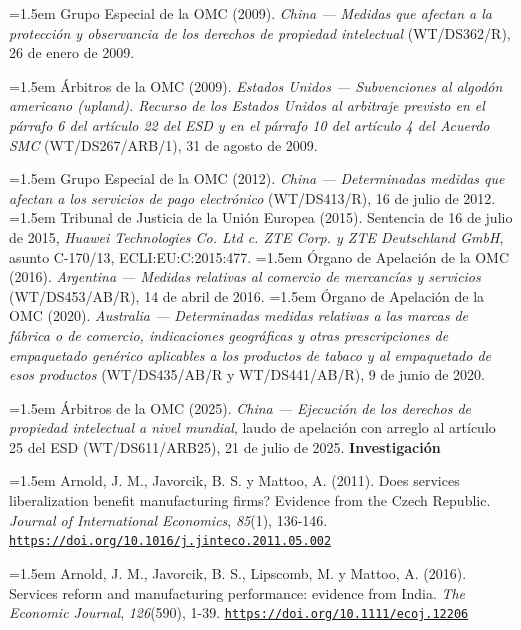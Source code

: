 \documentclass[10pt,a4paper]{article}
\begin{document}
\noindent\hangindent=1.5em Grupo Especial de la OMC (2009). \textit{China --- Medidas que afectan a la protección y observancia de los derechos de propiedad intelectual} (WT/DS362/R), 26 de enero de 2009.

\noindent\hangindent=1.5em Árbitros de la OMC (2009). \textit{Estados Unidos --- Subvenciones al algodón americano (upland). Recurso de los Estados Unidos al arbitraje previsto en el párrafo 6 del artículo 22 del ESD y en el párrafo 10 del artículo 4 del Acuerdo SMC} (WT/DS267/ARB/1), 31 de agosto de 2009.

\noindent\hangindent=1.5em Grupo Especial de la OMC (2012). \textit{China --- Determinadas medidas que afectan a los servicios de pago electrónico} (WT/DS413/R), 16 de julio de 2012.
\noindent\hangindent=1.5em Tribunal de Justicia de la Unión Europea (2015). Sentencia de 16 de julio de 2015, \textit{Huawei Technologies Co. Ltd c. ZTE Corp. y ZTE Deutschland GmbH}, asunto C-170/13, ECLI:EU:C:2015:477.
\noindent\hangindent=1.5em Órgano de Apelación de la OMC (2016). \textit{Argentina --- Medidas relativas al comercio de mercancías y servicios} (WT/DS453/AB/R), 14 de abril de 2016.
\noindent\hangindent=1.5em Órgano de Apelación de la OMC (2020). \textit{Australia --- Determinadas medidas relativas a las marcas de fábrica o de comercio, indicaciones geográficas y otras prescripciones de empaquetado genérico aplicables a los productos de tabaco y al empaquetado de esos productos} (WT/DS435/AB/R y WT/DS441/AB/R), 9 de junio de 2020.

\noindent\hangindent=1.5em Árbitros de la OMC (2025). \textit{China --- Ejecución de los derechos de propiedad intelectual a nivel mundial}, laudo de apelación con arreglo al artículo 25 del ESD (WT/DS611/ARB25), 21 de julio de 2025.
\textbf{Investigación}

\noindent\hangindent=1.5em Arnold, J. M., Javorcik, B. S. y Mattoo, A. (2011). Does services liberalization benefit manufacturing firms? Evidence from the Czech Republic. \textit{Journal of International Economics}, \textit{85}(1), 136-146. \href{https://doi.org/10.1016/j.jinteco.2011.05.002}{\nolinkurl{https://doi.org/10.1016/j.jinteco.2011.05.002}}

\noindent\hangindent=1.5em Arnold, J. M., Javorcik, B. S., Lipscomb, M. y Mattoo, A. (2016). Services reform and manufacturing performance: evidence from India. \textit{The Economic Journal}, \textit{126}(590), 1-39. \href{https://doi.org/10.1111/ecoj.12206}{\nolinkurl{https://doi.org/10.1111/ecoj.12206}}
\end{document}
